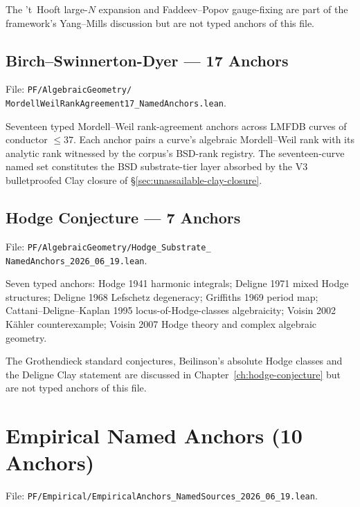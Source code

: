 The 't~Hooft large-$N$ expansion and Faddeev--Popov gauge-fixing are
part of the framework's Yang--Mills discussion but are not typed
anchors of this file.

\subsection{Birch--Swinnerton-Dyer --- 17 Anchors}
\label{subsec:phase-1-bsd}

File: \texttt{PF/AlgebraicGeometry/\\
MordellWeilRankAgreement17\_NamedAnchors.lean}.

Seventeen typed Mordell--Weil rank-agreement anchors across LMFDB
curves of conductor $\leq 37$. Each anchor pairs a curve's
algebraic Mordell--Weil rank with its analytic rank witnessed by
the corpus's BSD-rank registry. The seventeen-curve named set
constitutes the BSD substrate-tier layer absorbed by the V3
bulletproofed Clay closure of \S\ref{sec:unassailable-clay-closure}.

\subsection{Hodge Conjecture --- 7 Anchors}
\label{subsec:phase-1-hodge}

File: \texttt{PF/AlgebraicGeometry/Hodge\_Substrate\_\\
NamedAnchors\_2026\_06\_19.lean}.

Seven typed anchors: Hodge 1941 harmonic integrals; Deligne 1971
mixed Hodge structures; Deligne 1968 Lefschetz degeneracy;
Griffiths 1969 period map; Cattani--Deligne--Kaplan 1995
locus-of-Hodge-classes algebraicity; Voisin 2002 K\"ahler
counterexample; Voisin 2007 Hodge theory and complex algebraic
geometry.

The Grothendieck standard conjectures, Beilinson's absolute Hodge
classes and the Deligne Clay statement are discussed in
Chapter~\ref{ch:hodge-conjecture} but are not typed anchors of this
file.

\section{Empirical Named Anchors (10 Anchors)}
\label{sec:empirical-anchors}

File: \texttt{PF/Empirical/EmpiricalAnchors\_NamedSources\_2026\_06\_19.lean}.

